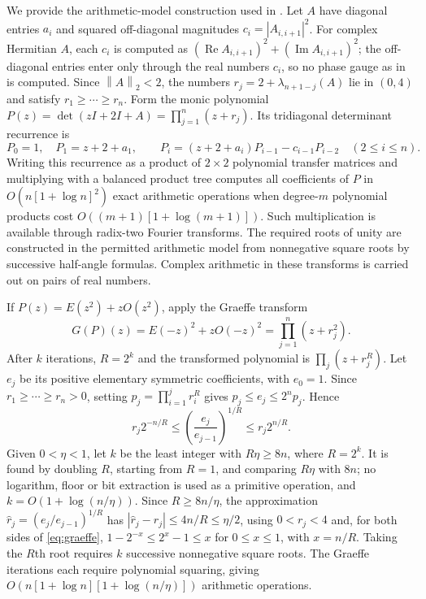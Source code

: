 \documentclass[10pt,a4paper]{article}
\newcommand{\norm}[1]{\left\lVert #1\right\rVert}
\begin{document}
We provide the arithmetic-model construction used in
. Let $A$ have diagonal entries $a_i$ and squared
off-diagonal magnitudes $c_i=|A_{i,i+1}|^2$. For complex
Hermitian $A$, each $c_i$ is computed as
$(\operatorname{Re}A_{i,i+1})^2+(\operatorname{Im}A_{i,i+1})^2$;
the off-diagonal entries enter only through the real numbers $c_i$,
so no phase gauge as in  is computed. Since
$\norm A_2<2$, the numbers $r_j=2+\lambda_{n+1-j}(A)$ lie in $(0,4)$
and satisfy $r_1\geq\cdots\geq r_n$.
Form the monic polynomial
$P(z)=\det(zI+2I+A)=\prod_{j=1}^n(z+r_j)$.
Its tridiagonal determinant recurrence is
\[
P_0=1,\quad P_1=z+2+a_1,\qquad
P_i=(z+2+a_i)P_{i-1}-c_{i-1}P_{i-2}\quad(2\leq i\leq n).
\]
Writing this recurrence as a product of $2\times2$ polynomial
transfer matrices and multiplying with a balanced product tree
computes all coefficients of $P$ in $O(n[1+\log n]^2)$
exact arithmetic operations when degree-$m$ polynomial products
cost $O((m+1)[1+\log(m+1)])$. Such multiplication is available
through radix-two Fourier transforms. The required roots of unity
are constructed in the permitted arithmetic model from
nonnegative square roots by successive half-angle formulas.
Complex arithmetic in these transforms is carried out on pairs
of real numbers.

If $P(z)=E(z^2)+zO(z^2)$, apply the Graeffe transform
\[
G(P)(z)=E(-z)^2+zO(-z)^2=\prod_{j=1}^n(z+r_j^2).
\]
After $k$ iterations, $R=2^k$ and the transformed polynomial is
$\prod_j(z+r_j^R)$. Let $e_j$ be its positive elementary symmetric
coefficients, with $e_0=1$. Since $r_1\geq\cdots\geq r_n>0$, setting
$p_j=\prod_{i=1}^j r_i^R$ gives
$p_j\leq e_j\leq 2^n p_j$. Hence
\begin{equation}\label{eq:graeffe}
\boxed{r_j2^{-n/R}\leq
\left(\frac{e_j}{e_{j-1}}\right)^{1/R}
\leq r_j2^{n/R}.}
\end{equation}
Given $0<\eta<1$, let $k$ be the least integer with
$R\eta\geq8n$, where $R=2^k$. It is found by doubling $R$,
starting from $R=1$, and comparing $R\eta$ with $8n$; no
logarithm, floor or bit extraction is used as a primitive
operation, and $k=O(1+\log(n/\eta))$. Since $R\geq8n/\eta$, the approximation
$\widehat r_j=(e_j/e_{j-1})^{1/R}$ has
$|\widehat r_j-r_j|\leq4n/R\leq\eta/2$,
using $0<r_j<4$ and, for both sides of \eqref{eq:graeffe},
$1-2^{-x}\leq2^x-1\leq x$ for $0\leq x\leq1$, with $x=n/R$.
Taking the $R$th root requires $k$ successive nonnegative square
roots. The Graeffe iterations each
require polynomial squaring, giving
$O(n[1+\log n][1+\log(n/\eta)])$ arithmetic operations.
\end{document}
